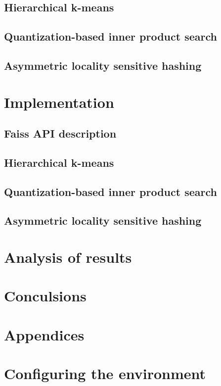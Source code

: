 \documentclass[12pt]{article}
\begin{document}
	\subsection{Hierarchical k-means}
	
	\subsection{Quantization-based inner product search}
	
	\subsection{Asymmetric locality sensitive hashing}
	
\section{Implementation}
	\subsection{Faiss API description}
	
	\subsection{Hierarchical k-means}
	
	\subsection{Quantization-based inner product search}
	
	\subsection{Asymmetric locality sensitive hashing}
	
\section{Analysis of results}
	
\section{Conculsions}
	


\newpage
\section{Appendices}
\appendix
\section{Configuring the environment}
	
\end{document}
